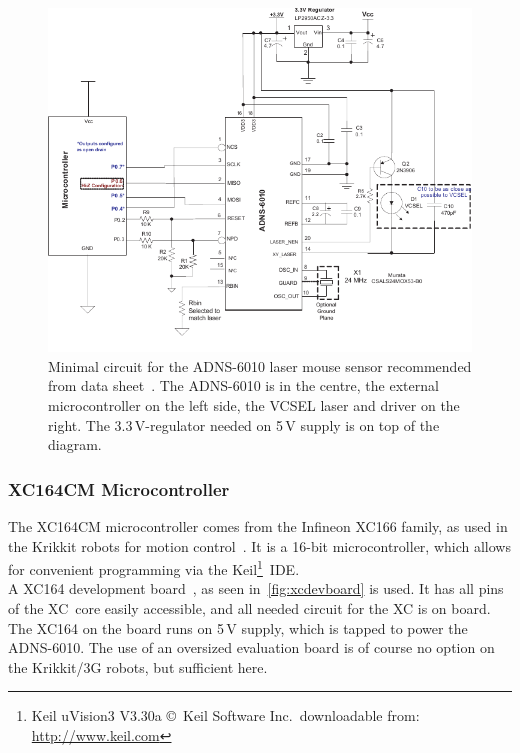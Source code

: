 \documentclass[12pt,a4paper]{article}
\begin{document}
\begin{figure}[htbp]
\begin{center}  
\includegraphics[width=1\columnwidth]{figures/adnsc}
\caption{\label{fig:adnsc}
Minimal circuit for the ADNS-6010 laser mouse sensor recommended from data sheet~\cite{adns}.
The ADNS-6010 is in the centre, the external microcontroller on the left side, the VCSEL laser and driver on the right.
The 3.3\,V-regulator needed on 5\,V supply is on top of the diagram.
}   
\end{center}
\end{figure}


\subsubsection{XC164CM Microcontroller}

The XC164CM microcontroller comes from the Infineon XC166 family, as used in the Krikkit robots for motion control~\cite{krammer07}.
It is a 16-bit microcontroller, which allows for convenient programming via the Keil\footnote{Keil uVision3 V3.30a \copyright~Keil Software Inc.\ downloadable from: \url{http://www.keil.com}}~IDE.\\
A XC164 development board~\cite{xc}, as seen in~\autoref{fig:xcdevboard} is used. 
It has all pins of the XC~core easily accessible, and all needed circuit for the XC is on board.
The XC164 on the board runs on 5\,V supply, which is tapped to power the ADNS-6010.
The use of an oversized evaluation board is of course no option on the Krikkit/3G robots, but sufficient here.
\end{document}
